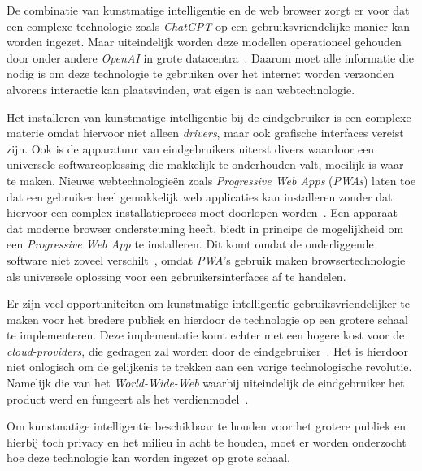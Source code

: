 \bigbreak{}

De combinatie van kunstmatige intelligentie en de web browser zorgt er voor dat een complexe technologie zoals \textit{ChatGPT} op een gebruiksvriendelijke manier kan worden ingezet. Maar uiteindelijk worden deze modellen operationeel gehouden door onder andere \textit{OpenAI} in grote datacentra~\autocite{Warren2023}. Daarom moet alle informatie die nodig is om deze technologie te gebruiken over het internet worden verzonden alvorens interactie kan plaatsvinden, wat eigen is aan webtechnologie.

\bigbreak{}

Het installeren van kunstmatige intelligentie bij de eindgebruiker is een complexe materie omdat hiervoor niet alleen \textit{drivers}, maar ook grafische interfaces vereist zijn. Ook is de apparatuur van eindgebruikers uiterst divers waardoor een universele softwareoplossing die makkelijk te onderhouden valt, moeilijk is waar te maken. Nieuwe webtechnologieën zoals \textit{Progressive Web Apps} (\textit{PWAs}) laten toe dat een gebruiker heel gemakkelijk web applicaties kan installeren zonder dat hiervoor een complex installatieproces moet doorlopen worden~\autocite{Pekala2023}. Een apparaat dat moderne browser ondersteuning heeft, biedt in principe de mogelijkheid om een \textit{Progressive Web App} te installeren. Dit komt omdat de onderliggende software niet zoveel verschilt~\autocite{Todavchich2019}, omdat \textit{PWA}'s gebruik maken browsertechnologie als universele oplossing voor een gebruikersinterfaces af te handelen.

\bigbreak{}

Er zijn veel opportuniteiten om kunstmatige intelligentie gebruiksvriendelijker te maken voor het bredere publiek en hierdoor de technologie op een grotere schaal te implementeren. Deze implementatie komt echter met een hogere kost voor de \textit{cloud-providers}, die gedragen zal worden door de eind\-ge\-brui\-ker~\autocite{Khan2024}. Het is hierdoor niet onlogisch om de gelijkenis te trekken aan een vorige technologische revolutie. Namelijk die van het \textit{World-Wide-Web} waarbij uiteindelijk de eind\-ge\-brui\-ker het product werd en fungeert als het verdienmodel~\autocite{quoteresearch2017, OKO2019}.

\bigbreak{}

Om kunstmatige intelligentie beschikbaar te houden voor het grotere publiek en hierbij toch privacy en het milieu in acht te houden, moet er worden onderzocht hoe deze technologie kan worden ingezet op grote schaal.

